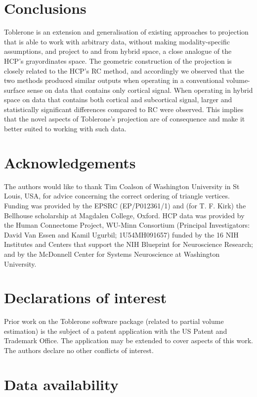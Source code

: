\documentclass[review]{elsarticle}
\begin{document}
\section{Conclusions}

Toblerone is an extension and generalisation of existing approaches to projection that is able to work with arbitrary data, without making modality-specific assumptions, and project to and from hybrid space, a close analogue of the HCP's grayordinates space. The geometric construction of the projection is closely related to the HCP's RC method, and accordingly we observed that the two methods produced similar outputs when operating in a conventional volume-surface sense on data that contains only cortical signal. When operating in hybrid space on data that contains both cortical and subcortical signal, larger and statistically significant differences compared to RC were observed. This implies that the novel aspects of Toblerone's projection are of consequence and make it better suited to working with such data. 

\section{Acknowledgements}

The authors would like to thank Tim Coalson of Washington University in St Louis, USA, for advice concerning the correct ordering of triangle vertices. Funding was provided by the EPSRC (EP/P012361/1) and (for T. F. Kirk) the Bellhouse scholarship at Magdalen College, Oxford. HCP data was provided by the Human Connectome Project, WU-Minn Consortium (Principal Investigators: David Van Essen and Kamil Ugurbil; 1U54MH091657) funded by the 16 NIH Institutes and Centers that support the NIH Blueprint for Neuroscience Research; and by the McDonnell Center for Systems Neuroscience at Washington University.

\section{Declarations of interest}

Prior work on the Toblerone software package (related to partial volume estimation) is the subject of a patent application with the US Patent and Trademark Office. The application may be extended to cover aspects of this work. The authors declare no other conflicts of interest. 

\section{Data availability} 
\end{document}
